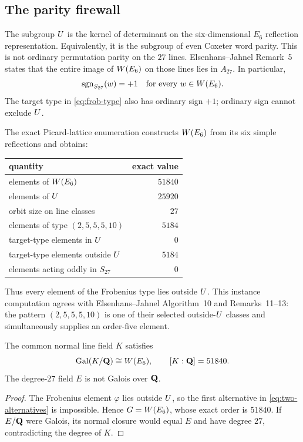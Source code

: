 \subsection{The parity firewall}

The subgroup \(U\) is the kernel of determinant on the six-dimensional
\(E_6\) reflection representation.  Equivalently, it is the subgroup of
even Coxeter word parity.  This is not ordinary permutation parity on the
\(27\) lines.  Elsenhans--Jahnel Remark~5 states that the entire image of
\(W(E_6)\) on those lines lies in \(A_{27}\).  In particular,
\begin{equation}
 \operatorname{sgn}_{S_{27}}(w)=+1
 \quad\text{for every }w\in W(E_6).
\label{eq:s27-even}
\end{equation}
The target type in \cref{eq:frob-type} also has ordinary sign \(+1\);
ordinary sign cannot exclude \(U\).

The exact Picard-lattice enumeration constructs \(W(E_6)\) from its six simple
reflections and obtains:
\begin{center}
\begin{tabular}{@{}lr@{}}
\toprule
quantity & exact value\\
\midrule
elements of \(W(E_6)\) & \(51840\)\\
elements of \(U\) & \(25920\)\\
orbit size on line classes & \(27\)\\
elements of type \((2,5,5,5,10)\) & \(5184\)\\
target-type elements in \(U\) & \(0\)\\
target-type elements outside \(U\) & \(5184\)\\
elements acting oddly in \(S_{27}\) & \(0\)\\
\bottomrule
\end{tabular}
\end{center}
Thus every element of the Frobenius type lies outside \(U\).  This
instance computation agrees with Elsenhans--Jahnel Algorithm~10 and
Remarks~11--13: the pattern \((2,5,5,5,10)\) is one of their selected
outside-\(U\) classes and simultaneously supplies an order-five
element.

\begin{theorem}
\label{thm:weyl}
The common normal line field \(K\) satisfies
\[
 \operatorname{Gal}(K/\mathbf Q)\cong W(E_6),\qquad [K:\mathbf Q]=51840.
\]
The degree-\(27\) field \(E\) is not Galois over \(\mathbf Q\).
\end{theorem}

\begin{proof}
The Frobenius element \(\varphi\) lies outside \(U\), so the first
alternative in \cref{eq:two-alternatives} is impossible.  Hence
\(G=W(E_6)\), whose exact order is \(51840\).  If \(E/\mathbf Q\) were Galois, its
normal closure would equal \(E\) and have degree \(27\), contradicting the
degree of \(K\).
\end{proof}
